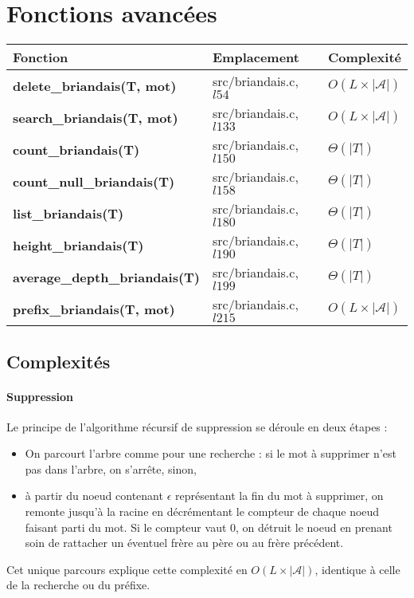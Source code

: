 \documentclass[11pt]{report} %
\begin{document}
\section{Fonctions avancées}

\begin{center}
\begin{tabular}{|l|l|l|}
\hline
\textbf{Fonction} & \textbf{Emplacement} & \textbf{Complexité}\\
\hline
\textbf{delete\_briandais(T, mot)} & src/briandais.c, $l54$ & $O(L \times |\mathcal{A}|)$\\
\hline
\textbf{search\_briandais(T, mot)} & src/briandais.c, $l133$ & $O(L \times |\mathcal{A}|)$\\
\hline
\textbf{count\_briandais(T)} & src/briandais.c, $l150$ & $\Theta(|T|)$\\
\hline
\textbf{count\_null\_briandais(T)} & src/briandais.c, $l158$ & $\Theta(|T|)$\\
\hline
\textbf{list\_briandais(T)} & src/briandais.c, $l180$ & $\Theta(|T|)$\\
\hline
\textbf{height\_briandais(T)} & src/briandais.c, $l190$ & $\Theta(|T|)$\\
\hline
\textbf{average\_depth\_briandais(T)} & src/briandais.c, $l199$ & $\Theta(|T|)$\\
\hline
\textbf{prefix\_briandais(T, mot)} & src/briandais.c, $l215$ & $O(L \times |\mathcal{A}|)$\\
\hline
\end{tabular}
\end{center}

\subsection{Complexités}
\label{subsec:suppression}

\paragraph{Suppression} Le principe de l'algorithme récursif de suppression se déroule en deux étapes :
\begin{itemize}
\item On parcourt l'arbre comme pour une recherche : si le mot à supprimer n'est pas dans l'arbre, on s'arrête, sinon,
\item à partir du noeud contenant $\epsilon$ représentant la fin du mot à supprimer, on remonte jusqu'à la racine en décrémentant le compteur de chaque noeud faisant parti du mot. Si le compteur vaut 0, on détruit le noeud en prenant soin de rattacher un éventuel frère au père ou au frère précédent.
\end{itemize}
Cet unique parcours explique cette complexité en $O(L \times |\mathcal{A}|)$, identique à celle de la recherche ou du préfixe.
\end{document}
